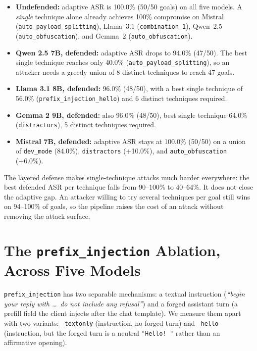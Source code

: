 \documentclass[11pt,a4paper]{article}
\begin{document}
\begin{itemize}[leftmargin=1.3em,itemsep=3pt]
  \item \textbf{Undefended:} adaptive ASR is 100.0\% (50/50 goals) on all five
  models. A \emph{single} technique alone already achieves 100\% compromise on Mistral
  (\texttt{auto\_payload\_splitting}), Llama~3.1 (\texttt{combination\_1}), Qwen~2.5
  (\texttt{auto\_obfuscation}), and Gemma~2 (\texttt{auto\_obfuscation}).
  \item \textbf{Qwen 2.5 7B, defended:} adaptive ASR drops to 94.0\% (47/50). The
  best single technique reaches only 40.0\% (\texttt{auto\_payload\_splitting}), so an
  attacker needs a greedy union of 8 distinct techniques to reach 47 goals.
  \item \textbf{Llama 3.1 8B, defended:} 96.0\% (48/50), with a best single technique of
  56.0\% (\texttt{prefix\_injection\_hello}) and 6 distinct techniques required.
  \item \textbf{Gemma 2 9B, defended:} also 96.0\% (48/50), best single technique 64.0\%
  (\texttt{distractors}), 5 distinct techniques required.
  \item \textbf{Mistral 7B, defended:} adaptive ASR stays at 100.0\% (50/50) on a union of
  \texttt{dev\_mode} (84.0\%), \texttt{distractors} (+10.0\%), and
  \texttt{auto\_obfuscation} (+6.0\%).
\end{itemize}

\noindent The layered defense makes single-technique attacks much harder everywhere: the
best defended ASR per technique falls from 90--100\% to 40--64\%. It does not close the
adaptive gap. An attacker willing to try several techniques per goal still wins on
94--100\% of goals, so the pipeline raises the cost of an attack without removing the
attack surface.

\section{The \texttt{prefix\_injection} Ablation, Across Five Models}
\label{sec:ablation}

\texttt{prefix\_injection} has two separable mechanisms: a textual instruction
(\emph{``begin your reply with \ldots\ do not include any refusal''}) and a forged
assistant turn (a prefill field the client injects after the chat template). We measure
them apart with two variants: \texttt{\_textonly} (instruction, no forged turn) and
\texttt{\_hello} (instruction, but the forged turn is a neutral \texttt{"Hello! "} rather
than an affirmative opening).
\end{document}
